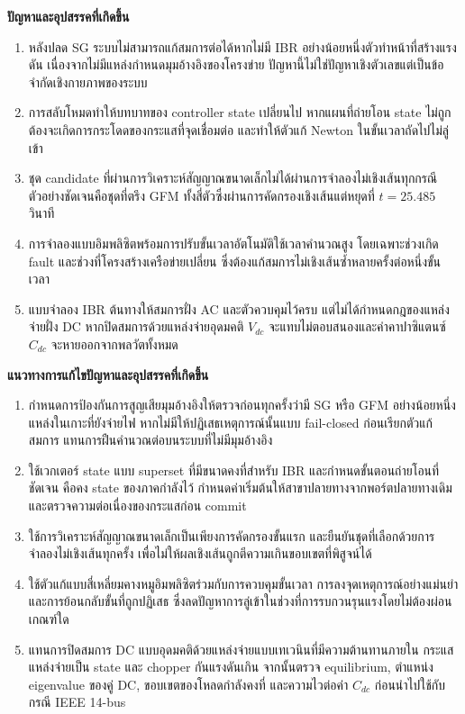 \documentclass[12pt,a4paper]{article}
\newcommand{\templateheading}[1]{%
  \vspace{0.45em}\noindent\colorbox{academicblue}{\parbox{\dimexpr\textwidth-2\fboxsep\relax}{\color{white}\fontsize{20}{22}\selectfont\bfseries #1}}\par\vspace{0.28em}}
\begin{document}
\templateheading{ปัญหาและอุปสรรคที่เกิดขึ้น}
\begin{enumerate}
\item หลังปลด SG ระบบไม่สามารถแก้สมการต่อได้หากไม่มี IBR อย่างน้อยหนึ่งตัวทำหน้าที่สร้างแรงดัน เนื่องจากไม่มีแหล่งกำหนดมุมอ้างอิงของโครงข่าย ปัญหานี้ไม่ใช่ปัญหาเชิงตัวเลขแต่เป็นข้อจำกัดเชิงกายภาพของระบบ
\item การสลับโหมดทำให้บทบาทของ controller state เปลี่ยนไป หากแผนที่ถ่ายโอน state ไม่ถูกต้องจะเกิดการกระโดดของกระแสที่จุดเชื่อมต่อ และทำให้ตัวแก้ Newton ในขั้นเวลาถัดไปไม่ลู่เข้า
\item ชุด candidate ที่ผ่านการวิเคราะห์สัญญาณขนาดเล็กไม่ได้ผ่านการจำลองไม่เชิงเส้นทุกกรณี ตัวอย่างชัดเจนคือชุดที่ตรึง GFM ทั้งสี่ตัวซึ่งผ่านการคัดกรองเชิงเส้นแต่หยุดที่ $t=25.485$ วินาที
\item การจำลองแบบอิมพลิซิตพร้อมการปรับขั้นเวลาอัตโนมัติใช้เวลาคำนวณสูง โดยเฉพาะช่วงเกิด fault และช่วงที่โครงสร้างเครือข่ายเปลี่ยน ซึ่งต้องแก้สมการไม่เชิงเส้นซ้ำหลายครั้งต่อหนึ่งขั้นเวลา
\item แบบจำลอง IBR ต้นทางให้สมการฝั่ง AC และตัวควบคุมไว้ครบ แต่ไม่ได้กำหนดกฎของแหล่งจ่ายฝั่ง DC หากปิดสมการด้วยแหล่งจ่ายอุดมคติ $V_{dc}$ จะแทบไม่ตอบสนองและค่าคาปาซิแตนซ์ $C_{dc}$ จะหายออกจากพลวัตทั้งหมด
\end{enumerate}

\templateheading{แนวทางการแก้ไขปัญหาและอุปสรรคที่เกิดขึ้น}
\begin{enumerate}
\item กำหนดการป้องกันการสูญเสียมุมอ้างอิงให้ตรวจก่อนทุกครั้งว่ามี SG หรือ GFM อย่างน้อยหนึ่งแหล่งในเกาะที่ยังจ่ายไฟ หากไม่มีให้ปฏิเสธเหตุการณ์นั้นแบบ fail-closed ก่อนเรียกตัวแก้สมการ แทนการฝืนคำนวณต่อบนระบบที่ไม่มีมุมอ้างอิง
\item ใช้เวกเตอร์ state แบบ superset ที่มีขนาดคงที่สำหรับ IBR และกำหนดขั้นตอนถ่ายโอนที่ชัดเจน คือคง state ของภาคกำลังไว้ กำหนดค่าเริ่มต้นให้สาขาปลายทางจากพอร์ตปลายทางเดิม และตรวจความต่อเนื่องของกระแสก่อน commit
\item ใช้การวิเคราะห์สัญญาณขนาดเล็กเป็นเพียงการคัดกรองขั้นแรก และยืนยันชุดที่เลือกด้วยการจำลองไม่เชิงเส้นทุกครั้ง เพื่อไม่ให้ผลเชิงเส้นถูกตีความเกินขอบเขตที่พิสูจน์ได้
\item ใช้ตัวแก้แบบสี่เหลี่ยมคางหมูอิมพลิซิตร่วมกับการควบคุมขั้นเวลา การลงจุดเหตุการณ์อย่างแม่นยำ และการย้อนกลับขั้นที่ถูกปฏิเสธ ซึ่งลดปัญหาการลู่เข้าในช่วงที่การรบกวนรุนแรงโดยไม่ต้องผ่อนเกณฑ์ใด
\item แทนการปิดสมการ DC แบบอุดมคติด้วยแหล่งจ่ายแบบเทเวนินที่มีความต้านทานภายใน กระแสแหล่งจ่ายเป็น state และ chopper กันแรงดันเกิน จากนั้นตรวจ equilibrium, ตำแหน่ง eigenvalue ของคู่ DC, ขอบเขตของโหลดกำลังคงที่ และความไวต่อค่า $C_{dc}$ ก่อนนำไปใช้กับกรณี IEEE 14-bus
\end{enumerate}
\end{document}
